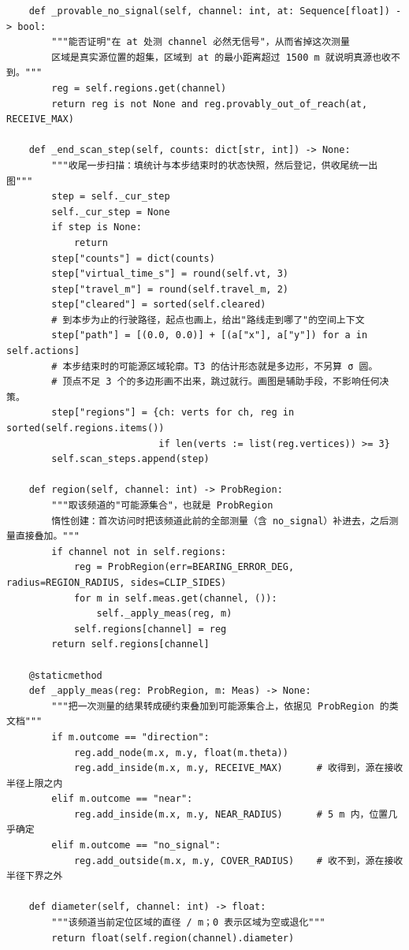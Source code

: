 \documentclass[UTF8, zihao=5,AutoFakeBold=2]{ctexart}
\begin{document}
\begin{lstlisting}
    def _provable_no_signal(self, channel: int, at: Sequence[float]) -> bool:
        """能否证明"在 at 处测 channel 必然无信号"，从而省掉这次测量
        区域是真实源位置的超集，区域到 at 的最小距离超过 1500 m 就说明真源也收不到。"""
        reg = self.regions.get(channel)
        return reg is not None and reg.provably_out_of_reach(at, RECEIVE_MAX)

    def _end_scan_step(self, counts: dict[str, int]) -> None:
        """收尾一步扫描：填统计与本步结束时的状态快照，然后登记，供收尾统一出图"""
        step = self._cur_step
        self._cur_step = None
        if step is None:
            return
        step["counts"] = dict(counts)
        step["virtual_time_s"] = round(self.vt, 3)
        step["travel_m"] = round(self.travel_m, 2)
        step["cleared"] = sorted(self.cleared)
        # 到本步为止的行驶路径，起点也画上，给出"路线走到哪了"的空间上下文
        step["path"] = [(0.0, 0.0)] + [(a["x"], a["y"]) for a in self.actions]
        # 本步结束时的可能源区域轮廓。T3 的估计形态就是多边形，不另算 σ 圆。
        # 顶点不足 3 个的多边形画不出来，跳过就行。画图是辅助手段，不影响任何决策。
        step["regions"] = {ch: verts for ch, reg in sorted(self.regions.items())
                           if len(verts := list(reg.vertices)) >= 3}
        self.scan_steps.append(step)

    def region(self, channel: int) -> ProbRegion:
        """取该频道的"可能源集合"，也就是 ProbRegion
        惰性创建：首次访问时把该频道此前的全部测量（含 no_signal）补进去，之后测量直接叠加。"""
        if channel not in self.regions:
            reg = ProbRegion(err=BEARING_ERROR_DEG, radius=REGION_RADIUS, sides=CLIP_SIDES)
            for m in self.meas.get(channel, ()):
                self._apply_meas(reg, m)
            self.regions[channel] = reg
        return self.regions[channel]

    @staticmethod
    def _apply_meas(reg: ProbRegion, m: Meas) -> None:
        """把一次测量的结果转成硬约束叠加到可能源集合上，依据见 ProbRegion 的类文档"""
        if m.outcome == "direction":
            reg.add_node(m.x, m.y, float(m.theta))
            reg.add_inside(m.x, m.y, RECEIVE_MAX)      # 收得到，源在接收半径上限之内
        elif m.outcome == "near":
            reg.add_inside(m.x, m.y, NEAR_RADIUS)      # 5 m 内，位置几乎确定
        elif m.outcome == "no_signal":
            reg.add_outside(m.x, m.y, COVER_RADIUS)    # 收不到，源在接收半径下界之外

    def diameter(self, channel: int) -> float:
        """该频道当前定位区域的直径 / m；0 表示区域为空或退化"""
        return float(self.region(channel).diameter)


\end{lstlisting}
\end{document}
